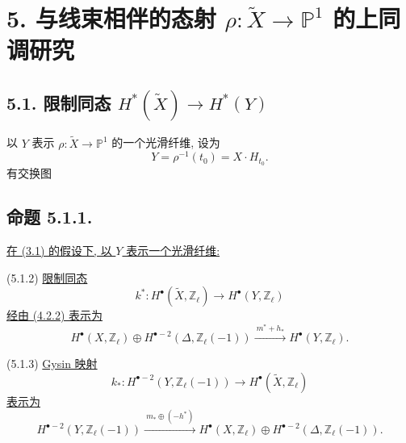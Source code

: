 \section*{5. 与线束相伴的态射 $\rho:\widetilde X\longrightarrow\mathbb P^1$ 的上同调研究}

\subsection*{5.1. 限制同态
$H^*(\widetilde X)\longrightarrow H^*(Y)$}

以 $Y$ 表示 $\rho:\widetilde X\to\mathbb P^1$ 的一个光滑纤维, 设为
\[
Y=\rho^{-1}(t_0)=X\mathbin{\cdot}H_{t_0}.
\]
有交换图
\begin{center}
\end{center}

\subsection*{命题 5.1.1.}
\underline{在 (3.1) 的假设下, 以 $Y$ 表示一个光滑纤维:}

\smallskip
\noindent
\textup{(5.1.2)} \underline{限制同态}
\[
k^*:H^\bullet(\widetilde X,\mathbb Z_\ell)
   \longrightarrow H^\bullet(Y,\mathbb Z_\ell)
\]
\underline{经由 (4.2.2) 表示为}
\[
H^\bullet(X,\mathbb Z_\ell)\oplus
H^{\bullet-2}(\Delta,\mathbb Z_\ell(-1))
\xrightarrow{\ m^*+h_*\ }
H^\bullet(Y,\mathbb Z_\ell).
\]

\noindent
\textup{(5.1.3)} \underline{Gysin 映射}
\[
k_*:H^{\bullet-2}(Y,\mathbb Z_\ell(-1))
   \longrightarrow H^\bullet(\widetilde X,\mathbb Z_\ell)
\]
\underline{表示为}
\[
H^{\bullet-2}(Y,\mathbb Z_\ell(-1))
\xrightarrow{\ m_*\oplus(-h^*)\ }
H^\bullet(X,\mathbb Z_\ell)\oplus
H^{\bullet-2}(\Delta,\mathbb Z_\ell(-1)).
\]

